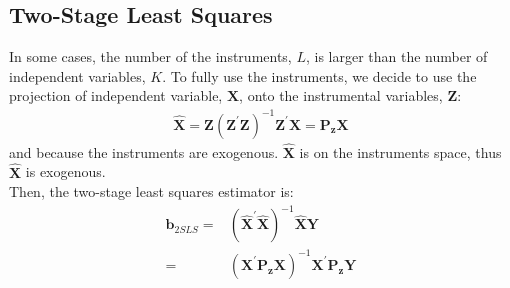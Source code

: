 \documentclass{article}
\begin{document}
\subsection{Two-Stage Least Squares}
In some cases, the number of the instruments, $L$, is larger than the number of independent variables, $K$. To fully use the instruments, we decide to use the projection of independent variable, $\boldsymbol{X}$, onto the instrumental variables, $\boldsymbol{Z}$:
	\begin{align*}
		\hat{\boldsymbol{X}} = \boldsymbol{Z} (\boldsymbol{Z}^\prime \boldsymbol{Z})^{-1} \boldsymbol{Z}^\prime \boldsymbol{X} = \boldsymbol{P_z}\boldsymbol{X}
	\end{align*}
and because the instruments are exogenous. $\hat{\boldsymbol{X}}$ is on the instruments space, thus $\hat{\boldsymbol{X}}$ is exogenous.\\
Then, the two-stage least squares estimator is:
	\begin{align*}
		\boldsymbol{b}_{2SLS} = &(\hat{\boldsymbol{X}}^\prime \hat{\boldsymbol{X}})^{-1} \hat{\boldsymbol{X}} \boldsymbol{Y}\\ = &
		(\boldsymbol{X}^\prime \boldsymbol{P_z} \boldsymbol{X})^{-1} \boldsymbol{X}^\prime \boldsymbol{P_z} \boldsymbol{Y}
	\end{align*}
\end{document}
